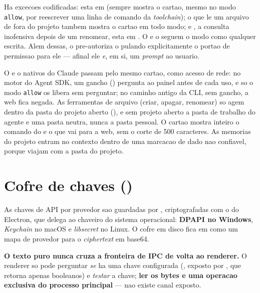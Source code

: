 Ha excecoes codificadas:  esta em
 (sempre mostra o cartao, mesmo no modo \lstinline|allow|,
por reescrever uma linha de comando da \emph{toolchain}); o 
que le um arquivo de fora do projeto tambem mostra o cartao em todo modo; e
, a consulta inofensiva depois de um renomear, esta em
. O  e o 
seguem o modo como qualquer escrita. Alem dessas, o 
pre-autoriza o  pulando explicitamente o portao de
permissao para ele --- afinal ele \emph{e}, em si, um \emph{prompt} ao usuario.

O  e o  nativos do Claude passam pelo mesmo
cartao, como acesso de rede: no motor do Agent SDK, um gancho
 () pergunta ao painel antes de
cada uso, e so o modo \lstinline|allow| os libera sem perguntar; no caminho
antigo da CLI, sem gancho, a web fica negada. As ferramentas de arquivo
(criar, apagar, renomear) so agem dentro da pasta do projeto aberto
(), e sem projeto aberto a pasta de trabalho
do agente e uma pasta neutra, nunca a pasta pessoal. O cartao mostra inteiro o
comando do  e o que vai para a web, sem o corte de 500
caracteres. As memorias do projeto entram no contexto dentro de uma marcacao de
dado nao confiavel, porque viajam com a pasta do projeto.

\section{Cofre de chaves ()}

As chaves de API por provedor sao guardadas por ,
criptografadas com o  do Electron, que delega ao chaveiro do
sistema operacional: \textbf{DPAPI no Windows}, \emph{Keychain} no macOS e
\emph{libsecret} no Linux. O cofre em disco fica em
 como um mapa de provedor para o
\emph{ciphertext} em base64.

\begin{nota}
\textbf{O texto puro nunca cruza a fronteira de IPC de volta ao renderer.} O
renderer so pode perguntar \emph{se} ha uma chave configurada
(, exposto por , que retorna apenas
booleanos) e \emph{testar} a chave; \textbf{ler os bytes e uma operacao exclusiva
do processo principal} --- nao existe canal  exposto.
\end{nota}

